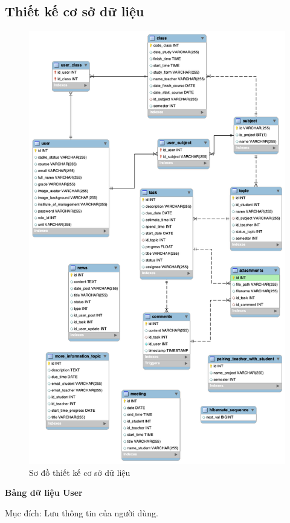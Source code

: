 \documentclass[../Main.tex]{subfiles}
\begin{document}
\subsection{Thiết kế cơ sở dữ liệu}
\begin{figure}[H]
    \centering
    \includegraphics[width=0.8\linewidth]{Figure/Untitled.png}
    \caption{Sơ đồ thiết kế cơ sở dữ liệu}
    \label{fig:use_case_tổng_quan}
\end{figure}
\newpage
\textbf{Bảng dữ liệu User}

Mục đích: Lưu thông tin của người dùng.
\end{document}
